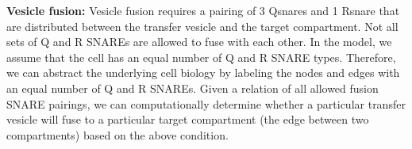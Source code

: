 
\textbf{Vesicle fusion:}
%
% 
%
%  
%
%
Vesicle fusion requires a pairing of 3 Qsnares and 1 Rsnare that are distributed between the transfer vesicle and the target compartment. 
%
%
Not all sets of Q and R SNAREs are allowed to fuse with each other.
%
In the model, we assume that the cell has an equal number of Q and R SNARE types.
%
Therefore, we can abstract the underlying cell biology by labeling the nodes and edges with an equal number of Q and R SNAREs. 
%
%
Given a relation of all allowed fusion SNARE pairings, we can computationally determine whether a particular transfer vesicle will fuse to a particular target compartment (the edge between two compartments) based on the above condition.  

